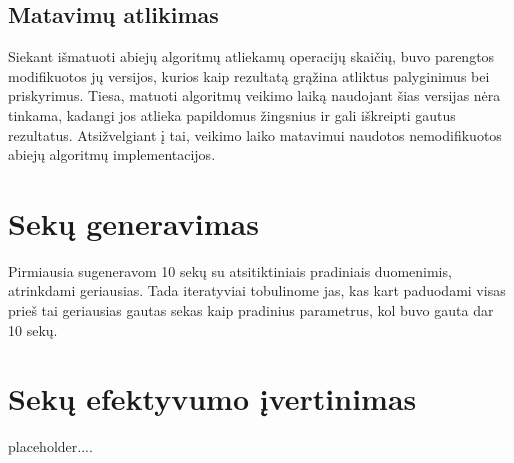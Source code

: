 \documentclass{VUMIFInfKursinis}
\begin{document}
\subsection{Matavimų atlikimas}
Siekant išmatuoti abiejų algoritmų atliekamų operacijų skaičių, buvo parengtos modifikuotos jų
versijos, kurios kaip rezultatą grąžina atliktus palyginimus bei priskyrimus.
Tiesa, matuoti algoritmų veikimo laiką naudojant šias versijas nėra tinkama,
kadangi jos atlieka papildomus žingsnius ir gali iškreipti gautus rezultatus.
Atsižvelgiant į tai, veikimo laiko matavimui naudotos nemodifikuotos abiejų algoritmų implementacijos. 

\section{Sekų generavimas}
Pirmiausia sugeneravom 10 sekų su atsitiktiniais pradiniais duomenimis, atrinkdami geriausias.
Tada iteratyviai tobulinome jas, kas kart paduodami visas prieš tai geriausias gautas sekas kaip pradinius parametrus, kol buvo gauta dar 10 sekų.


\section{Sekų efektyvumo įvertinimas}
placeholder....


\end{document}

